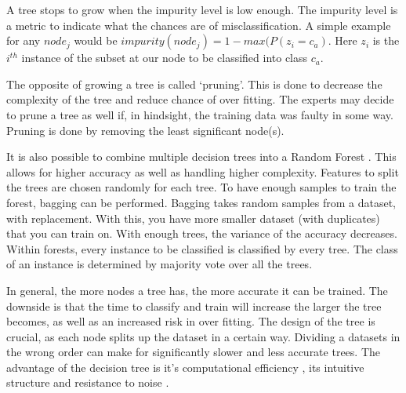 A tree stops to grow when the impurity level is low enough. The impurity level is a metric to indicate what the chances are of misclassification. A simple example for any $node_j$ would be $impurity(node_j) = 1 - max(P(z_i = c_a) $. Here $z_i$ is the $i^{th}$ instance of the subset at our node to be classified into class $c_a$. 

The opposite of growing a tree is called `pruning'. This is done to decrease the complexity of the tree and reduce chance of over fitting. The experts may decide to prune a tree as well if, in hindsight, the training data was faulty in some way. Pruning is done by removing the least significant node(s). 

It is also possible to combine multiple decision trees into a Random Forest \cite{breiman2001random}. This allows for higher accuracy as well as handling higher complexity. Features to split the trees are chosen randomly for each tree. To have enough samples to train the forest, bagging can be performed. Bagging takes random samples from a dataset, with replacement. With this, you have more smaller dataset (with duplicates) that you can train on. With enough trees, the variance of the accuracy decreases. Within forests, every instance to be classified is classified by every tree. The class of an instance is determined by majority vote over all the trees. 

In general, the more nodes a tree has, the more accurate it can be trained. The downside is that the time to classify and train will increase the larger the tree becomes, as well as an increased risk in over fitting. The design of the tree is crucial, as each node splits up the dataset in a certain way. Dividing a datasets in the wrong order can make for significantly slower and less accurate trees. The advantage of the decision tree is it's computational efficiency \cite{safavian1991survey}, its intuitive structure and resistance to noise \cite{LópezChau20136283}.